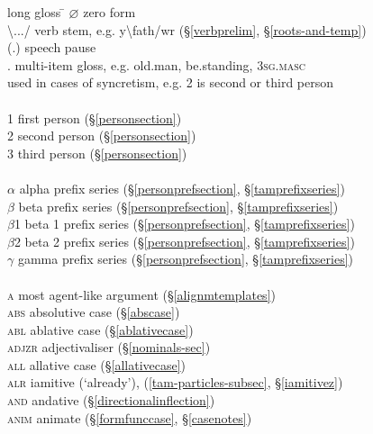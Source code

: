 \begin{tabbing}
	long gloss \= \kill
	\textsc{$\varnothing$} \> zero form\\
	{\textbackslash.../} \> {verb stem, e.g. y\textbackslash fath/wr (\S\ref{verbprelim}, \S\ref{roots-and-temp})}\\
	{(.)} \> {speech pause}\\
	{.} \> {multi-item gloss, e.g. old.man, be.standing, \textsc{3sg.masc}}\\
	{\textbar} \> {used in cases of syncretism, e.g. 2 is second or third person}\\\\
	\textsc{1} \> {first person (\S\ref{personsection})}\\
	\textsc{2} \> {second person (\S\ref{personsection})}\\
	\textsc{3} \> {third person (\S\ref{personsection})}\\\\
	\textsc{$\alpha{}$} \> {alpha prefix series (\S\ref{personprefsection}, \S\ref{tamprefixseries})}\\
	\textsc{$\beta{}$} \> {beta prefix series (\S\ref{personprefsection}, \S\ref{tamprefixseries})}\\
	\textsc{$\beta{}$1} \> {beta 1 prefix series (\S\ref{personprefsection}, \S\ref{tamprefixseries})}\\
	\textsc{$\beta{}$2} \> {beta 2 prefix series (\S\ref{personprefsection}, \S\ref{tamprefixseries})}\\
	\textsc{$\gamma{}$} \> {gamma prefix series (\S\ref{personprefsection}, \S\ref{tamprefixseries})}\\\\
	\textsc{a} \> {most agent-like argument (\S\ref{alignmtemplates})}\\
	\textsc{abs} \> {absolutive case (\S\ref{abscase})}\\
	\textsc{abl} \> {ablative case (\S\ref{ablativecase})}\\
	\textsc{adjzr} \> {adjectivaliser (\S\ref{nominals-sec})}\\
	\textsc{all} \> {allative case (\S\ref{allativecase})}\\
	\textsc{alr} \> {iamitive (`already'), (\ref{tam-particles-subsec}, \S\ref{iamitivez})}\\
	\textsc{and} \> {andative (\S\ref{directionalinflection})}\\
	\textsc{anim} \> {animate (\S\ref{formfunccase}, \S\ref{casenotes})}\\

\end{tabbing}
